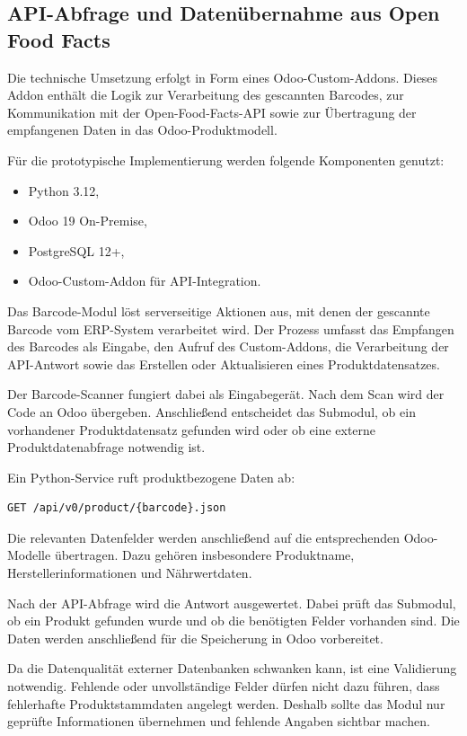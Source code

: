 \documentclass[12pt,a4paper]{article}
\begin{document}
\subsection{API-Abfrage und Datenübernahme aus Open Food Facts}

Die technische Umsetzung erfolgt in Form eines Odoo-Custom-Addons. Dieses Addon enthält die Logik zur Verarbeitung des gescannten Barcodes, zur Kommunikation mit der Open-Food-Facts-API sowie zur Übertragung der empfangenen Daten in das Odoo-Produktmodell.

Für die prototypische Implementierung werden folgende Komponenten genutzt:

\begin{itemize}
    \item Python 3.12,
    \item Odoo 19 On-Premise,
    \item PostgreSQL 12+,
    \item Odoo-Custom-Addon für API-Integration.
\end{itemize}

Das Barcode-Modul löst serverseitige Aktionen aus, mit denen der gescannte Barcode vom ERP-System verarbeitet wird. Der Prozess umfasst das Empfangen des Barcodes als Eingabe, den Aufruf des Custom-Addons, die Verarbeitung der API-Antwort sowie das Erstellen oder Aktualisieren eines Produktdatensatzes.

Der Barcode-Scanner fungiert dabei als Eingabegerät. Nach dem Scan wird der Code an Odoo übergeben. Anschließend entscheidet das Submodul, ob ein vorhandener Produktdatensatz gefunden wird oder ob eine externe Produktdatenabfrage notwendig ist.

Ein Python-Service ruft produktbezogene Daten ab:

\begin{lstlisting}[caption={Produktbezogene API-Abfrage}]
GET /api/v0/product/{barcode}.json
\end{lstlisting}

Die relevanten Datenfelder werden anschließend auf die entsprechenden Odoo-Modelle übertragen. Dazu gehören insbesondere Produktname, Herstellerinformationen und Nährwertdaten.

Nach der API-Abfrage wird die Antwort ausgewertet. Dabei prüft das Submodul, ob ein Produkt gefunden wurde und ob die benötigten Felder vorhanden sind. Die Daten werden anschließend für die Speicherung in Odoo vorbereitet.

Da die Datenqualität externer Datenbanken schwanken kann, ist eine Validierung notwendig. Fehlende oder unvollständige Felder dürfen nicht dazu führen, dass fehlerhafte Produktstammdaten angelegt werden. Deshalb sollte das Modul nur geprüfte Informationen übernehmen und fehlende Angaben sichtbar machen.
\end{document}

